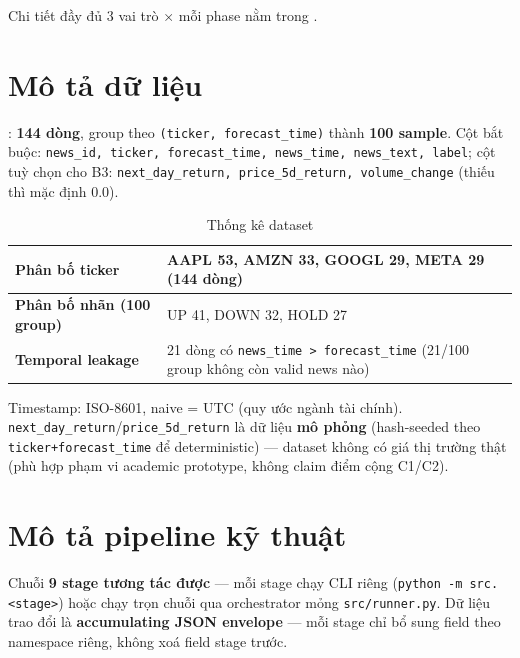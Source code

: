 Chi tiết đầy đủ 3 vai trò × mỗi phase nằm trong .

\section{Mô tả dữ liệu}

: \textbf{144 dòng}, group theo \texttt{(ticker, forecast\_time)} thành \textbf{100 sample}. Cột bắt buộc: \texttt{news\_id, ticker, forecast\_time, news\_time, news\_text, label}; cột tuỳ chọn cho B3: \texttt{next\_day\_return, price\_5d\_return, volume\_change} (thiếu thì mặc định 0.0).

\begin{table}[H]
\centering
\caption{Thống kê dataset}
\begin{tabularx}{\textwidth}{|X|X|}
\hline
\textbf{Phân bố ticker} & AAPL 53, AMZN 33, GOOGL 29, META 29 (144 dòng) \\ \hline
\textbf{Phân bố nhãn (100 group)} & UP 41, DOWN 32, HOLD 27 \\ \hline
\textbf{Temporal leakage} & 21 dòng có \texttt{news\_time > forecast\_time} (21/100 group không còn valid news nào) \\ \hline
\end{tabularx}
\end{table}

Timestamp: ISO-8601, naive = UTC (quy ước ngành tài chính). \texttt{next\_day\_return}/\texttt{price\_5d\_return} là dữ liệu \textbf{mô phỏng} (hash-seeded theo \texttt{ticker+forecast\_time} để deterministic) — dataset không có giá thị trường thật (phù hợp phạm vi academic prototype, không claim điểm cộng C1/C2).

\section{Mô tả pipeline kỹ thuật}

Chuỗi \textbf{9 stage tương tác được} — mỗi stage chạy CLI riêng (\texttt{python -m src.<stage>}) hoặc chạy trọn chuỗi qua orchestrator mỏng \texttt{src/runner.py}. Dữ liệu trao đổi là \textbf{accumulating JSON envelope} — mỗi stage chỉ bổ sung field theo namespace riêng, không xoá field stage trước.

